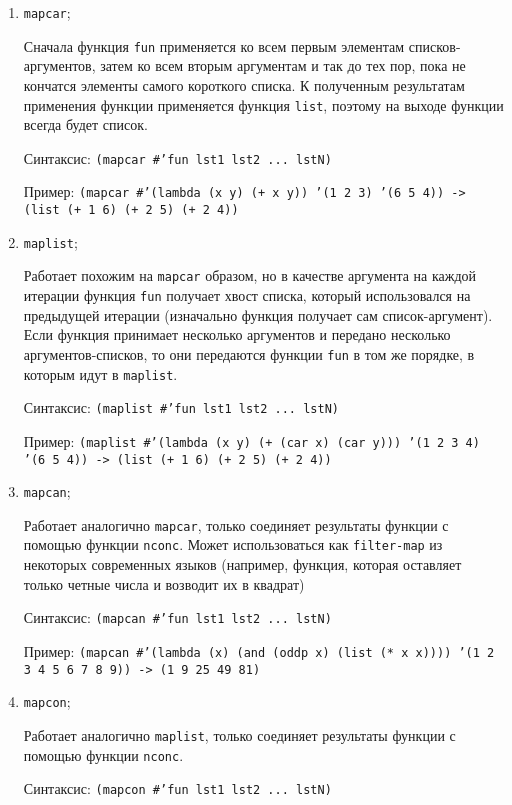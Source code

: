 \begin{enumerate}
    \item \texttt{mapcar};

        Сначала функция \texttt{fun} применяется ко всем первым элементам списков-аргументов, затем ко всем вторым аргументам и так до тех пор, пока не кончатся элементы самого короткого списка. К полученным результатам применения функции применяется функция \texttt{list}, поэтому на выходе функции всегда будет список.

        Синтаксис: \texttt{(mapcar \#'fun lst1 lst2 ... lstN)}

        Пример: \texttt{(mapcar \#'(lambda (x y) (+ x y)) '(1 2 3) '(6 5 4)) -> (list (+ 1 6) (+ 2 5) (+ 2 4))}

    \item \texttt{maplist};

        Работает похожим на \texttt{mapcar} образом, но в качестве аргумента на каждой итерации функция \texttt{fun} получает хвост списка, который использовался на предыдущей итерации (изначально функция получает сам список-аргумент). Если функция принимает несколько аргументов и передано несколько аргументов-списков, то они передаются функции \texttt{fun} в том же порядке, в которым идут в \texttt{maplist}.

        Синтаксис: \texttt{(maplist \#'fun lst1 lst2 ... lstN)}

        Пример: \texttt{(maplist \#'(lambda (x y) (+ (car x) (car y))) '(1 2 3 4) '(6 5 4)) -> (list (+ 1 6) (+ 2 5) (+ 2 4))}

    \item \texttt{mapcan};

        Работает аналогично \texttt{mapcar}, только соединяет результаты функции с помощью функции \texttt{nconc}. Может использоваться как \texttt{filter-map} из некоторых современных языков (например, функция, которая оставляет только четные числа и возводит их в квадрат)

        Синтаксис: \texttt{(mapcan \#'fun lst1 lst2 ... lstN)}

        Пример: \texttt{(mapcan \#'(lambda (x) (and (oddp x) (list (* x x)))) '(1 2 3 4 5 6 7 8 9)) -> (1 9 25 49 81)}

    \item \texttt{mapcon};

        Работает аналогично \texttt{maplist}, только соединяет результаты функции с помощью функции \texttt{nconc}.

        Синтаксис: \texttt{(mapcon \#'fun lst1 lst2 ... lstN)}


\end{enumerate}
